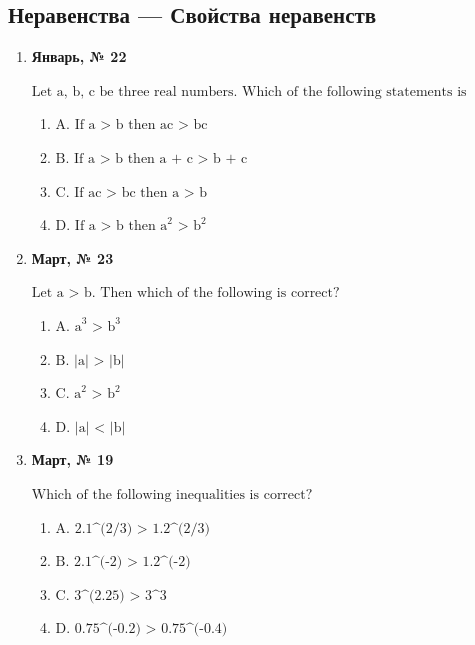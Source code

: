 \subsection*{Неравенства — Свойства неравенств}
\begin{enumerate}
\item \textbf{Январь, № 22} \par \smallskip
$\displaystyle \text{Let a, b, c be three real numbers. Which of the following statements is correct? ( )}$
\begin{enumerate}
\item $\displaystyle \text{A.  If a > b then ac > bc}$
\item $\displaystyle \text{B.  If a > b then a + c > b + c}$
\item $\displaystyle \text{C.  If ac > bc then a > b}$
\item $\displaystyle \text{D.  If a > b then a}^{2}\text{ > b}^{2}$
\end{enumerate}
\item \textbf{Март, № 23} \par \smallskip
$\displaystyle \text{Let a > b. Then which of the following is correct?}$
\begin{enumerate}
\item $\displaystyle \text{A. a}^{3}\text{ > b}^{3}$
\item $\displaystyle \text{B. |a| > |b|}$
\item $\displaystyle \text{C. a}^{2}\text{ > b}^{2}$
\item $\displaystyle \text{D. |a| < |b|}$
\end{enumerate}
\item \textbf{Март, № 19} \par \smallskip
$\displaystyle \text{Which of the following inequalities is correct?}$
\begin{enumerate}
\item $\displaystyle \text{A. 2.1^(2/3) > 1.2^(2/3)}$
\item $\displaystyle \text{B. 2.1^(-2) > 1.2^(-2)}$
\item $\displaystyle \text{C. 3^(2.25) > 3^3}$
\item $\displaystyle \text{D. 0.75^(-0.2) > 0.75^(-0.4)}$
\end{enumerate}
\end{enumerate}

